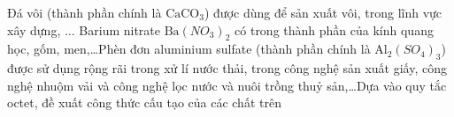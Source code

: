 	\begin{bt}
		Đá vôi (thành phần chính là $\mathrm{CaCO}_3$) được dùng để sản xuất vôi, trong lĩnh vực xây dựng, $\ldots$ Barium nitrate $\mathrm{Ba}\left(NO_3\right)_2$ có trong thành phần của kính quang học, gốm, men,\ldots Phèn đơn aluminium sulfate (thành phần chính là $\mathrm{Al}_2\left(SO_4\right)_3$) được sử dụng rộng rãi trong xử lí nước thải, trong công nghệ sản xuất giấy, công nghệ nhuộm vải và công nghệ lọc nước và nuôi trồng thuỷ sản,\ldots Dựa vào quy tắc octet, đề xuất công thức cấu tạo của các chất trên
	\end{bt}
